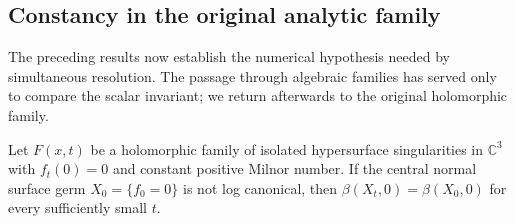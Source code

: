 \subsection{Constancy in the original analytic family}
The preceding results now establish the numerical hypothesis needed by
simultaneous resolution.  The passage through algebraic families has served
only to compare the scalar invariant; we return afterwards to the original
holomorphic family.

\begin{theorem}
\label{thm:beta-constant}
Let $F(x,t)$ be a holomorphic family of isolated hypersurface singularities
in $\mathbb C^3$ with $f_t(0)=0$ and constant positive Milnor number.
If the central normal surface germ $X_0=\{f_0=0\}$ is not log canonical,
then $\beta(X_t,0)=\beta(X_0,0)$ for every sufficiently small $t$.
\end{theorem}

